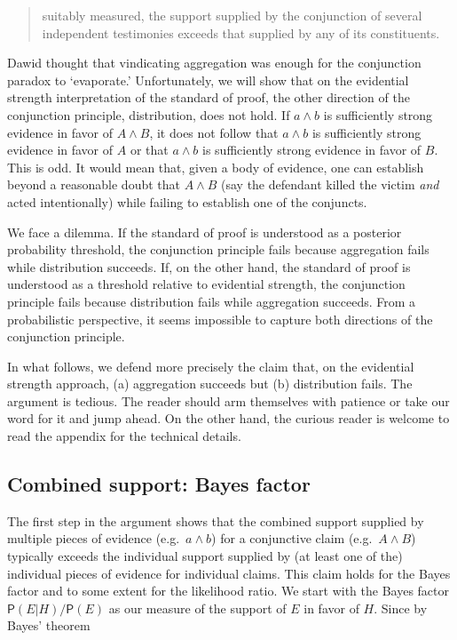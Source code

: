 \documentclass[
  10pt,
  dvipsnames,enabledeprecatedfontcommands]{scrartcl}
\newcommand{\pr}[1]{\ensuremath{\mathsf{P}(#1)}}
\begin{document}
\begin{quote} suitably measured, the support supplied by the conjunction of several independent testimonies exceeds that supplied by any of its constituents.
 \end{quote}

\noindent Dawid thought that vindicating aggregation was enough for the
conjunction paradox to `evaporate.' Unfortunately, we will show that on
the evidential strength interpretation of the standard of proof, the
other direction of the conjunction principle, distribution, does not
hold. If \(a \wedge b\) is sufficiently strong evidence in favor of
\(A \wedge B\), it does not follow that \(a\wedge b\) is sufficiently
strong evidence in favor of \(A\) or that \(a\wedge b\) is sufficiently
strong evidence in favor of \(B\). This is odd. It would mean that,
given a body of evidence, one can establish beyond a reasonable doubt
that \(A \wedge B\) (say the defendant killed the victim \textit{and}
acted intentionally) while failing to establish one of the conjuncts.

We face a dilemma. If the standard of proof is understood as a posterior
probability threshold, the conjunction principle fails because
aggregation fails while distribution succeeds. If, on the other hand,
the standard of proof is understood as a threshold relative to
evidential strength, the conjunction principle fails because
distribution fails while aggregation succeeds. From a probabilistic
perspective, it seems impossible to capture both directions of the
conjunction principle.

In what follows, we defend more precisely the claim that, on the
evidential strength approach, (a) aggregation succeeds but (b)
distribution fails. The argument is tedious. The reader should arm
themselves with patience or take our word for it and jump ahead. On the
other hand, the curious reader is welcome to read the appendix for the
technical details.

\hypertarget{combined-support-bayes-factor}{%
\subsection{Combined support: Bayes
factor}\label{combined-support-bayes-factor}}

The first step in the argument shows that the combined support supplied
by multiple pieces of evidence (e.g.~\(a\wedge b\)) for a conjunctive
claim (e.g.~\(A\wedge B\)) typically exceeds the individual support
supplied by (at least one of the) individual pieces of evidence for
individual claims. This claim holds for the Bayes factor and to some
extent for the likelihood ratio. We start with the Bayes factor
\(\pr{E \vert H}/\pr{E}\) as our measure of the support of \(E\) in
favor of \(H\). Since by Bayes' theorem
\end{document}
